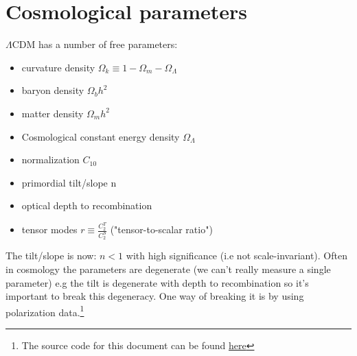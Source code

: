 \documentclass{article}
\begin{document}
\section{Cosmological parameters}
$\Lambda$CDM has a number of free parameters:
\begin{itemize}
  \item curvature density $\Omega_k \equiv 1 - \Omega_m - \Omega_\Lambda$
  \item baryon density $\Omega_b h^2$
  \item matter density $\Omega_m h^2$
  \item Cosmological constant energy density $\Omega_\Lambda$
  \item normalization $C_10$
  \item primordial tilt/slope n
  \item optical depth to recombination
  \item tensor modes $r\equiv \frac{C_2^T}{C_2^S}$ ("tensor-to-scalar ratio")
\end{itemize}
The tilt/slope is now: $n<1$ with high significance (i.e not scale-invariant). Often in cosmology the parameters are degenerate (we can't really measure a single parameter) e.g the tilt is degenerate with depth to recombination so it's important to break this degeneracy. One way of breaking it is by using polarization data.\footnote{The source code for this document can be found \href{https://github.com/arthuradriaens-code/Early-Universe-Cosmology/tree/main/CMB}{here}}
\end{document}
